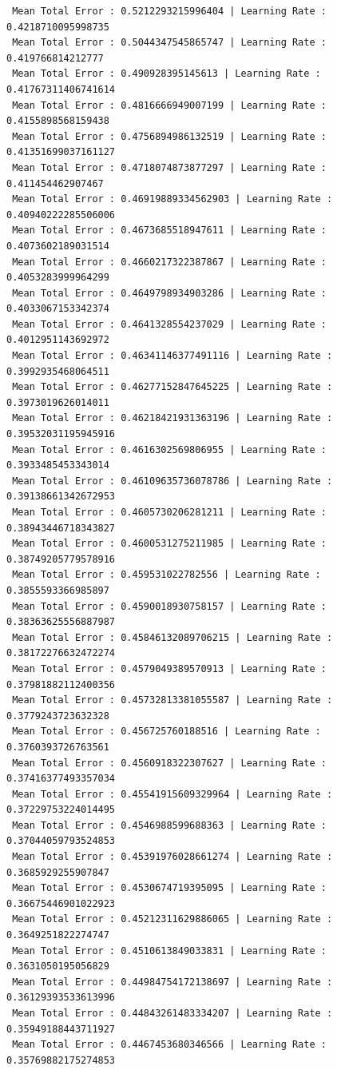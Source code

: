 \documentclass[]{report}
\begin{document}
\begin{verbatim}
 Mean Total Error : 0.5212293215996404 | Learning Rate : 0.4218710095998735
 Mean Total Error : 0.5044347545865747 | Learning Rate : 0.419766814212777
 Mean Total Error : 0.490928395145613 | Learning Rate : 0.41767311406741614
 Mean Total Error : 0.4816666949007199 | Learning Rate : 0.4155898568159438
 Mean Total Error : 0.4756894986132519 | Learning Rate : 0.41351699037161127
 Mean Total Error : 0.4718074873877297 | Learning Rate : 0.411454462907467
 Mean Total Error : 0.46919889334562903 | Learning Rate : 0.40940222285506006
 Mean Total Error : 0.4673685518947611 | Learning Rate : 0.4073602189031514
 Mean Total Error : 0.4660217322387867 | Learning Rate : 0.4053283999964299
 Mean Total Error : 0.4649798934903286 | Learning Rate : 0.4033067153342374
 Mean Total Error : 0.4641328554237029 | Learning Rate : 0.4012951143692972
 Mean Total Error : 0.46341146377491116 | Learning Rate : 0.3992935468064511
 Mean Total Error : 0.46277152847645225 | Learning Rate : 0.3973019626014011
 Mean Total Error : 0.46218421931363196 | Learning Rate : 0.39532031195945916
 Mean Total Error : 0.4616302569806955 | Learning Rate : 0.3933485453343014
 Mean Total Error : 0.46109635736078786 | Learning Rate : 0.39138661342672953
 Mean Total Error : 0.4605730206281211 | Learning Rate : 0.38943446718343827
 Mean Total Error : 0.4600531275211985 | Learning Rate : 0.38749205779578916
 Mean Total Error : 0.459531022782556 | Learning Rate : 0.3855593366985897
 Mean Total Error : 0.4590018930758157 | Learning Rate : 0.38363625556887987
 Mean Total Error : 0.45846132089706215 | Learning Rate : 0.38172276632472274
 Mean Total Error : 0.4579049389570913 | Learning Rate : 0.37981882112400356
 Mean Total Error : 0.45732813381055587 | Learning Rate : 0.3779243723632328
 Mean Total Error : 0.456725760188516 | Learning Rate : 0.3760393726763561
 Mean Total Error : 0.4560918322307627 | Learning Rate : 0.37416377493357034
 Mean Total Error : 0.45541915609329964 | Learning Rate : 0.37229753224014495
 Mean Total Error : 0.4546988599688363 | Learning Rate : 0.37044059793524853
 Mean Total Error : 0.45391976028661274 | Learning Rate : 0.3685929255907847
 Mean Total Error : 0.4530674719395095 | Learning Rate : 0.36675446901022923
 Mean Total Error : 0.45212311629886065 | Learning Rate : 0.3649251822274747
 Mean Total Error : 0.4510613849033831 | Learning Rate : 0.3631050195056829
 Mean Total Error : 0.44984754172138697 | Learning Rate : 0.36129393533613996
 Mean Total Error : 0.44843261483334207 | Learning Rate : 0.35949188443711927
 Mean Total Error : 0.4467453680346566 | Learning Rate : 0.35769882175274853

\end{verbatim}
\end{document}
